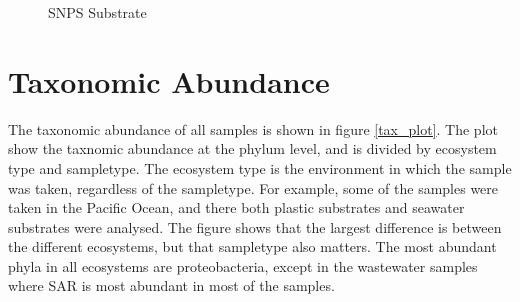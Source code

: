 \begin{figure}[h]
    \centering
    \caption{SNPS Substrate}
    \label{snps_substrate}
\end{figure}

\section{Taxonomic Abundance}
The taxonomic abundance of all samples is shown in figure \ref{tax_plot}. The plot show the taxnomic abundance at the phylum level, and is divided by ecosystem type and sampletype. 
The ecosystem type is the environment in which the sample was taken, regardless of the sampletype. For example, some of the samples were taken in the Pacific Ocean, and there both plastic substrates and seawater substrates were analysed.
The figure shows that the largest difference is between the different ecosystems, but that sampletype also matters.
The most abundant phyla in all ecosystems are proteobacteria, except in the wastewater samples where SAR is most abundant in most of the samples.


